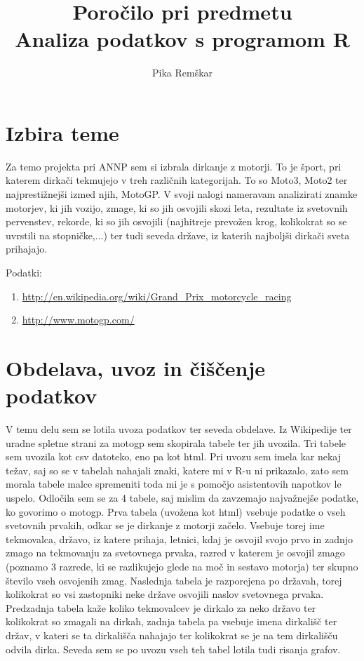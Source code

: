\documentclass[11pt,a4paper]{article}
\begin{document}
\title{Poročilo pri predmetu \\
Analiza podatkov s programom R}
\author{Pika Remškar}
\maketitle

\section{Izbira teme}

Za temo projekta pri ANNP sem si izbrala dirkanje z motorji. To je šport, pri katerem dirkači tekmujejo v treh različnih kategorijah. To so Moto3, Moto2 ter najprestižnejši izmed njih, MotoGP. V svoji nalogi nameravam analizirati znamke motorjev, ki jih vozijo, zmage, ki so jih osvojili skozi leta, rezultate iz svetovnih pervenstev, rekorde, ki so jih osvojili (najhitreje prevožen krog, kolikokrat so se uvrstili na stopničke,...) ter tudi seveda države, iz katerih najboljši dirkači sveta prihajajo. 

Podatki: 
\begin{enumerate}
\item \url{http://en.wikipedia.org/wiki/Grand_Prix_motorcycle_racing}
\item \url{http://www.motogp.com/}
\end{enumerate}

\section{Obdelava, uvoz in čiščenje podatkov}

V temu delu sem se lotila uvoza podatkov ter seveda obdelave. Iz Wikipedije ter uradne spletne strani za motogp sem skopirala tabele ter jih uvozila. Tri tabele sem uvozila kot csv datoteko, eno pa kot html. Pri uvozu sem imela kar nekaj težav, saj so se v tabelah nahajali znaki, katere mi v R-u ni prikazalo, zato sem morala tabele malce spremeniti toda mi je s pomočjo asistentovih napotkov le uspelo. Odločila sem se za 4 tabele, saj mislim da zavzemajo najvažnejše podatke, ko govorimo o motogp. Prva tabela (uvožena kot html) vsebuje podatke o vseh svetovnih prvakih, odkar se je dirkanje z motorji začelo. Vsebuje torej ime tekmovalca, državo, iz katere prihaja, letnici, kdaj je osvojil svojo prvo in zadnjo zmago na tekmovanju za svetovnega prvaka, razred v katerem je osvojil zmago (poznamo 3 razrede, ki se razlikujejo glede na moč in sestavo motorja) ter skupno število vseh osvojenih zmag. Naslednja tabela je razporejena po državah, torej kolikokrat so vsi zastopniki neke države osvojili naslov svetovnega prvaka. Predzadnja tabela kaže koliko tekmovalcev je dirkalo za neko državo ter kolikokrat so zmagali na dirkah, zadnja tabela pa vsebuje imena dirkališč ter držav, v kateri se ta dirkališča nahajajo ter kolikokrat se je na tem dirkališču odvila dirka. Seveda sem se po uvozu vseh teh tabel lotila tudi risanja grafov. 
\end{document}
